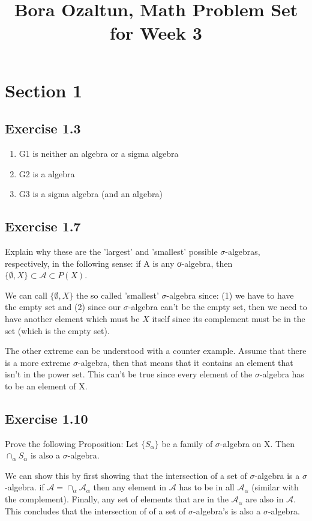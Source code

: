 \documentclass[a4paper]{article}
\begin{document}
\title{Bora Ozaltun, Math Problem Set for Week 3}
\maketitle

\section*{Section 1}
\subsection*{Exercise 1.3}
\begin{enumerate}
  \item G1 is neither an algebra or a sigma algebra
  \item G2 is a algebra
  \item G3 is a sigma algebra (and an algebra)
\end{enumerate}


\subsection*{Exercise 1.7}

Explain why these are the ’largest’ and ’smallest’ possible $\sigma$-algebras, respectively, in the following sense: if A is any σ-algebra, then $\{\emptyset, X\} \subset \mathcal{A} \subset P(X)$.

We can call $\{\emptyset, X\}$ the so called 'smallest' $\sigma$-algebra since: (1) we have to have the empty set and (2) since our $\sigma$-algebra can't be the empty set, then we need to have another element which must be $X$ itself since its complement must be in the set (which is the empty set).

The other extreme can be understood with a counter example. Assume that there is a more extreme $\sigma$-algebra, then that means that it contains an element that isn't in the power set. This can't be true since every element of the $\sigma$-algebra has to be an element of X.

 \subsection*{Exercise 1.10}
Prove the following Proposition:
Let $\{S_{\alpha}\}$ be a family of $\sigma$-algebra on X. Then 􏰛$\cap_{\alpha} S_{\alpha}$ is also a $\sigma$-algebra.

We can show this by first showing that the intersection of a set of $\sigma$-algebra is a $\sigma$-algebra. if $\mathcal{A} = \cap_{\alpha} \mathcal{A}_{\alpha}$ then any element in $\mathcal{A}$ has to be in all $\mathcal{A}_{\alpha}$ (similar with the complement). Finally, any set of elements that are in the $\mathcal{A}_{\alpha}$ are also in $\mathcal{A}$. This concludes that the intersection of of a set of $\sigma$-algebra's is also a $\sigma$-algebra.
\end{document}
